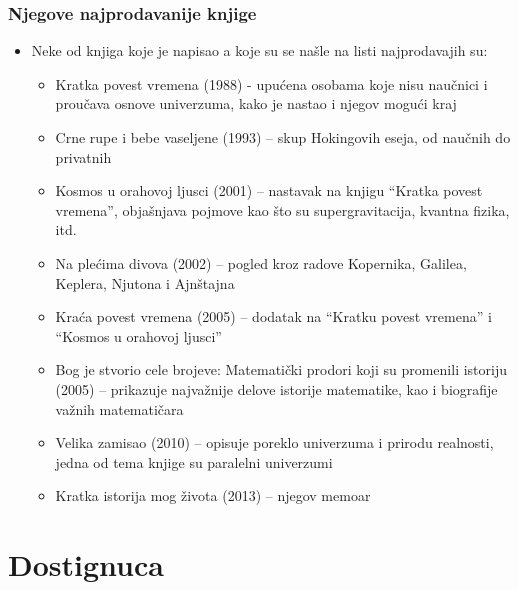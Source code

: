 \documentclass{beamer}
\begin{document}
\begin{frame}[fragile]\frametitle{ Njegove najprodavanije knjige}
	\begin{itemize}	\fontsize{9}{6}\selectfont	
		\item Neke od knjiga koje je napisao a koje su se našle na listi najprodavajih su:
		\begin{itemize}\fontsize{9}{6}\selectfont
 \item Kratka povest vremena (1988) - upućena osobama koje nisu naučnici i proučava osnove univerzuma, kako je nastao i njegov mogući kraj
 \item Crne rupe i bebe vaseljene (1993) – skup Hokingovih eseja, od naučnih do privatnih
 \item Kosmos u orahovoj ljusci (2001) – nastavak na knjigu “Kratka povest vremena”, objašnjava pojmove kao što su supergravitacija, kvantna fizika, itd.
 \item Na plećima divova (2002) – pogled kroz radove Kopernika, Galilea, Keplera, Njutona i Ajnštajna
 \item Kraća povest vremena (2005) – dodatak na “Kratku povest vremena” i “Kosmos u orahovoj ljusci”
 \item Bog je stvorio cele brojeve: Matematički prodori koji su promenili istoriju (2005) –  prikazuje najvažnije delove istorije matematike, kao i biografije važnih matematičara
 \item Velika zamisao (2010) – opisuje poreklo univerzuma i prirodu realnosti, jedna od tema knjige su paralelni univerzumi
 \item Kratka istorija mog života (2013) – njegov memoar
\end{itemize}
\end{itemize}
\end{frame}	
	\section{Dostignuca}
	
\end{document}
